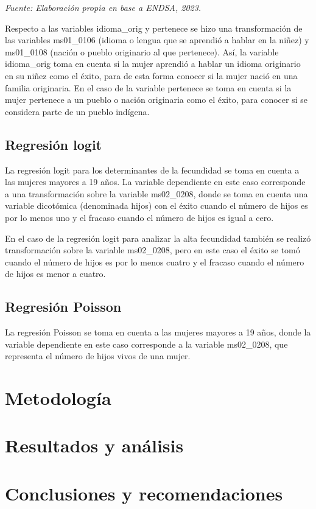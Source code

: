 \documentclass[Royal,times,sageh]{sagej}
\begin{document}
\emph{Fuente: Elaboración propia en base a ENDSA, 2023.}

Respecto a las variables idioma\_orig y pertenece se hizo una
transformación de las variables ms01\_0106 (idioma o lengua que se
aprendió a hablar en la niñez) y ms01\_0108 (nación o pueblo originario
al que pertenece). Así, la variable idioma\_orig toma en cuenta si la
mujer aprendió a hablar un idioma originario en su niñez como el éxito,
para de esta forma conocer si la mujer nació en una familia originaria.
En el caso de la variable pertenece se toma en cuenta si la mujer
pertenece a un pueblo o nación originaria como el éxito, para conocer si
se considera parte de un pueblo indígena.

\subsection{Regresión logit}\label{regresiuxf3n-logit}

La regresión logit para los determinantes de la fecundidad se toma en
cuenta a las mujeres mayores a 19 años. La variable dependiente en este
caso corresponde a una transformación sobre la variable ms02\_0208,
donde se toma en cuenta una variable dicotómica (denominada hijos) con
el éxito cuando el número de hijos es por lo menos uno y el fracaso
cuando el número de hijos es igual a cero.

En el caso de la regresión logit para analizar la alta fecundidad
también se realizó transformación sobre la variable ms02\_0208, pero en
este caso el éxito se tomó cuando el número de hijos es por lo menos
cuatro y el fracaso cuando el número de hijos es menor a cuatro.

\subsection{Regresión Poisson}\label{regresiuxf3n-poisson-1}

La regresión Poisson se toma en cuenta a las mujeres mayores a 19 años,
donde la variable dependiente en este caso corresponde a la variable
ms02\_0208, que representa el número de hijos vivos de una mujer.

\section{Metodología}\label{metodologuxeda}

\section{Resultados y análisis}\label{resultados-y-anuxe1lisis}

\section{Conclusiones y
recomendaciones}\label{conclusiones-y-recomendaciones}



\end{document}
